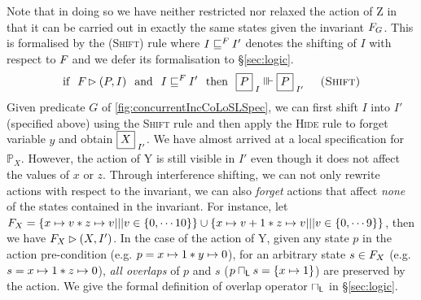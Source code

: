 %
Note that in doing so we have neither restricted nor relaxed the action of \textsf{Z} in that it can be carried out in exactly the same states given the invariant $F_{G}$. This is formalised by the \textsc{(Shift)} rule where $I \sqsubseteq^{F_{}} I'$ denotes the shifting of $I$ with respect to $F_{}$ and we defer its formalisation to \S\ref{sec:logic}.
%
\[
	\text{if}\hspace*{0.25cm} \fence{} \fences (P, I) 
	\hspace*{0.25cm}\text{and}\hspace*{0.25cm} I \weakenI{\fence{}} I'
	\hspace*{0.25cm}\text{then}\hspace*{0.25cm}
	\shared{P}{I} \Vvdash \shared{P}{I'} \hspace*{0.5cm} \textsc{(Shift)}
\]
%
Given predicate $G$ of \fig\ref{fig:concurrentIncCoLoSLSpec}, we can first shift $I$ into $I'$ (specified above) using the \textsc{Shift} rule and then apply the \textsc{Hide} rule to forget variable $y$ and obtain $\shared{X}{I'}$.
We have almost arrived at a local specification for $\mathbb{P}_X$. However, the action of \textsf{Y} is still visible in $I'$ even though it does not affect the values of $x$ or $z$. Through interference shifting, we can not only rewrite actions with respect to the invariant, we can also \emph{forget} actions that affect \emph{none} of the states contained in the invariant. For instance, let $F_{X} = \left\{x \mapsto v * z \mapsto v ||| v \in \{0, \cdots 10\} \right\} \cup \left\{x \mapsto v+1 * z \mapsto v ||| v \in \{0, \cdots 9 \} \right\}$, then we have $F_{X} \rhd (X, I')$. In the case of the action of \textsf{Y}, given any state $p$ in the action pre-condition (e.g. $p = x \mapsto 1 * y \mapsto 0$), for an arbitrary state $s \in F_{X}$ (e.g. $s = x \mapsto 1 * z \mapsto 0$), \emph{all overlaps} of $p$ and $s$ ($p \sqcap_{\textsf{L}} s = \{x \mapsto 1\}$) are preserved by the action. We give the formal definition of overlap operator $\sqcap_{\textsf{L}}$ in \S\ref{sec:logic}. 
%
%

